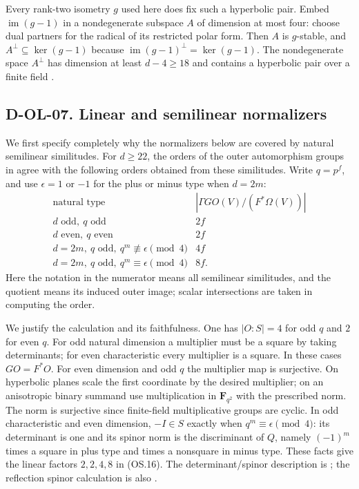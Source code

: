Every rank-two isometry $g$ used here does fix such a hyperbolic
pair.  Embed $\operatorname{im}(g-1)$ in a nondegenerate subspace
$A$ of dimension at most four: choose dual partners for the radical
of its restricted polar form.  Then $A$ is $g$-stable, and
$A^\perp\subseteq\ker(g-1)$ because
$\operatorname{im}(g-1)^\perp=\ker(g-1)$.
The nondegenerate space $A^\perp$ has dimension at least $d-4\ge18$
and contains a hyperbolic pair over a finite field
\cite[Theorem~11.2 and its ensuing decomposition, p.~138]{OS:Taylor1992}.

\subsection*{D-OL-07. Linear and semilinear normalizers}

We first specify completely why the normalizers below are covered
by natural semilinear similitudes.  For $d\ge22$, the orders of the
outer automorphism groups in
\cite[Section~2.2.2, Table~2.1, p.~14]{HES:LiXia2022} agree with
the following orders obtained from these similitudes.  Write
$q=p^f$, and use $\epsilon=1$ or $-1$ for the plus or minus type
when $d=2m$:
\[
\begin{array}{c|c}
\text{natural type}&|\Gamma\!GO(V)/(F^*\Omega(V))|\\ \hline
d\text{ odd},\ q\text{ odd}&2f\\
d\text{ even},\ q\text{ even}&2f\\
d=2m,\ q\text{ odd},\ q^m\not\equiv\epsilon\pmod4&4f\\
d=2m,\ q\text{ odd},\ q^m\equiv\epsilon\pmod4&8f.
\end{array}
 \tag{OS.16}
\]
Here the notation in the numerator means all semilinear similitudes,
and the quotient means its induced outer image; scalar intersections
are taken in computing the order.

We justify the calculation and its faithfulness.  One has
$|O:S|=4$ for odd $q$ and $2$ for even $q$.
For odd natural dimension a multiplier must be a square by taking
determinants; for even characteristic every multiplier is a square.
In these cases $GO=F^*O$.  For even dimension and odd $q$ the
multiplier map is surjective.  On hyperbolic planes scale the first
coordinate by the desired multiplier; on an anisotropic binary
summand use multiplication in $\mathbf F_{q^2}$ with the prescribed
norm.  The norm is surjective since finite-field multiplicative
groups are cyclic.  In odd characteristic and even dimension,
$-I\in S$ exactly when $q^m\equiv\epsilon\pmod4$: its determinant
is one and its spinor norm is the discriminant of $Q$, namely
$(-1)^m$ times a square in plus type and times a nonsquare in minus
type.  These facts give the linear factors $2,2,4,8$ in (OS.16).
The determinant/spinor description is
\cite[Section~2, pp.~41--43]{OL:KTV2023}; the reflection spinor
calculation is also \cite[p.~163]{OS:Taylor1992}.

